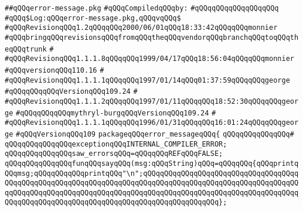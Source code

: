 \label{src/app/burg/error-message.pkg}
\verb|##qQQqerror-message.pkg|\newline
\newline
\verb|#qQQqCompiledqQQqby:|\newline
\verb|#qQQqqQQqqQQqqQQqqQQq|\newline
\newline
\verb|#qQQq$Log:qQQqerror-message.pkg,qQQqvqQQq$|\newline
\verb|#qQQqRevisionqQQq1.2qQQqqQQq2000/06/01qQQq18:33:42qQQqqQQqmonnier|\newline
\verb|#qQQqbringqQQqrevisionsqQQqfromqQQqtheqQQqvendorqQQqbranchqQQqtoqQQqtheqQQqtrunk|\newline
\verb|#|\newline
\verb|#qQQqRevisionqQQq1.1.1.8qQQqqQQq1999/04/17qQQq18:56:04qQQqqQQqmonnier|\newline
\verb|#qQQqversionqQQq110.16|\newline
\verb|#|\newline
\verb|#qQQqRevisionqQQq1.1.1.1qQQqqQQq1997/01/14qQQq01:37:59qQQqqQQqgeorge|\newline
\verb|#qQQqqQQqqQQqVersionqQQq109.24|\newline
\verb|#|\newline
\verb|#qQQqRevisionqQQq1.1.1.2qQQqqQQq1997/01/11qQQqqQQq18:52:30qQQqqQQqgeorge|\newline
\verb|#qQQqqQQqqQQqmythryl-burgqQQqVersionqQQq109.24|\newline
\verb|#|\newline
\verb|#qQQqRevisionqQQq1.1.1.1qQQqqQQq1996/01/31qQQqqQQq16:01:24qQQqqQQqgeorge|\newline
\verb|#qQQqVersionqQQq109|\newline
\newline
\verb|packageqQQqerror_messageqQQq{|\newline
\verb|qQQqqQQqqQQqqQQq#|\newline
\verb|qQQqqQQqqQQqqQQqexceptionqQQqINTERNAL_COMPILER_ERROR;|\newline
\newline
\verb|qQQqqQQqqQQqqQQqsaw_errorsqQQq=qQQqqQQqREFqQQqFALSE;|\newline
\newline
\verb|qQQqqQQqqQQqqQQqfunqQQqsayqQQq(msg:qQQqString)qQQq=qQQqqQQq{qQQqprintqQQqmsg;qQQqqQQqqQQqprintqQQq"\n";qQQqqQQqqQQqqQQqqQQqqQQqqQQqqQQqqQQqqQQqqQQqqQQqqQQqqQQqqQQqqQQqqQQqqQQqqQQqqQQqqQQqqQQqqQQqqQQqqQQqqQQqqQQqqQQqqQQqqQQqqQQqqQQqqQQqqQQqqQQqqQQqqQQqqQQqqQQqqQQqqQQqqQQqqQQqqQQqqQQqqQQqqQQqqQQqqQQqqQQqqQQqqQQqqQQqqQQqqQQqqQQqqQQq};|\newline
